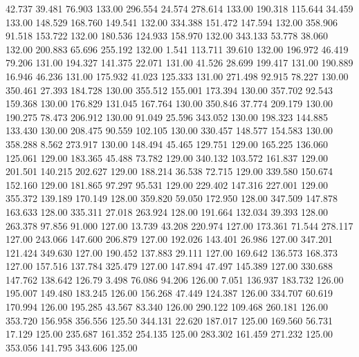   42.737   39.481   76.903       133.00
 296.554   24.574  278.614       133.00
 190.318  115.644   34.459       133.00
 148.529  168.760  149.541       132.00
 334.388  151.472  147.594       132.00
 358.906   91.518  153.722       132.00
 180.536  124.933  158.970       132.00
 343.133   53.778   38.060       132.00
 200.883   65.696  255.192       132.00
   1.541  113.711   39.610       132.00
 196.972   46.419   79.206       131.00
 194.327  141.375   22.071       131.00
  41.526   28.699  199.417       131.00
 190.889   16.946   46.236       131.00
 175.932   41.023  125.333       131.00
 271.498   92.915   78.227       130.00
 350.461   27.393  184.728       130.00
 355.512  155.001  173.394       130.00
 357.702   92.543  159.368       130.00
 176.829  131.045  167.764       130.00
 350.846   37.774  209.179       130.00
 190.275   78.473  206.912       130.00
  91.049   25.596  343.052       130.00
 198.323  144.885  133.430       130.00
 208.475   90.559  102.105       130.00
 330.457  148.577  154.583       130.00
 358.288    8.562  273.917       130.00
 148.494   45.465  129.751       129.00
 165.225  136.060  125.061       129.00
 183.365   45.488   73.782       129.00
 340.132  103.572  161.837       129.00
 201.501  140.215  202.627       129.00
 188.214   36.538   72.715       129.00
 339.580  150.674  152.160       129.00
 181.865   97.297   95.531       129.00
 229.402  147.316  227.001       129.00
 355.372  139.189  170.149       128.00
 359.820   59.050  172.950       128.00
 347.509  147.878  163.633       128.00
 335.311   27.018  263.924       128.00
 191.664  132.034   39.393       128.00
 263.378   97.856   91.000       127.00
  13.739   43.208  220.974       127.00
 173.361   71.544  278.117       127.00
 243.066  147.600  206.879       127.00
 192.026  143.401   26.986       127.00
 347.201  121.424  349.630       127.00
 190.452  137.883   29.111       127.00
 169.642  136.573  168.373       127.00
 157.516  137.784  325.479       127.00
 147.894   47.497  145.389       127.00
 330.688  147.762  138.642       126.79
   3.498   76.086   94.206       126.00
   7.051  136.937  183.732       126.00
 195.007  149.480  183.245       126.00
 156.268   47.449  124.387       126.00
 334.707   60.619  170.994       126.00
 195.285   43.567   83.340       126.00
 290.122  109.468  260.181       126.00
 353.720  156.958  356.556       125.50
 344.131   22.620  187.017       125.00
 169.560   56.731   17.129       125.00
 235.687  161.352  254.135       125.00
 283.302  161.459  271.232       125.00
 353.056  141.795  343.606       125.00
